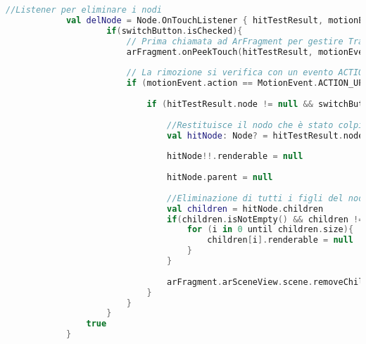 \documentclass[crop=false, class=book]{standalone}
\begin{document}
	\begin{center}
		\begin{minipage}{0.95\textwidth}
			\begin{lstlisting}[caption={Eliminazione di un nodo dalla scena in Plane Detection.}, label={lst: delete-node}, language=Kotlin]
			//Listener per eliminare i nodi
			val delNode = Node.OnTouchListener { hitTestResult, motionEvent ->
					if(switchButton.isChecked){
						// Prima chiamata ad ArFragment per gestire TrasformableNode
						arFragment.onPeekTouch(hitTestResult, motionEvent)
						
						// La rimozione si verifica con un evento ACTION UP
						if (motionEvent.action == MotionEvent.ACTION_UP) {
							
							if (hitTestResult.node != null && switchButton.isChecked) {
								
								//Restituisce il nodo che è stato colpito dal hitTest
								val hitNode: Node? = hitTestResult.node
								
								hitNode!!.renderable = null
								
								hitNode.parent = null
								
								//Eliminazione di tutti i figli del nodo
								val children = hitNode.children
								if(children.isNotEmpty() && children != null){
									for (i in 0 until children.size){
										children[i].renderable = null
									}
								}
							
								arFragment.arSceneView.scene.removeChild(hitNode)
							}
						}
					}
				true
			}
			\end{lstlisting}
		\end{minipage}
	\end{center}
	
			
	
\end{document}
